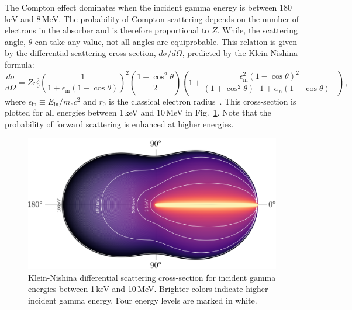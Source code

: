 The Compton effect dominates when the incident gamma energy is between 180\,keV and 8\,MeV. The probability of Compton scattering depends on the number of electrons in the absorber and is therefore proportional to $Z$. While, the scattering angle, $\theta$ can take any value, not all angles are equiprobable. This relation is given by the differential scattering cross-section, $d\sigma/d\Omega$, predicted by the Klein-Nishina formula:
\begin{equation}
	\frac{d\sigma}{d\Omega} = Zr_0^2\left(\frac{1}{1+\epsilon_\text{in}(1 - \cos\theta)}\right)^2 \left(\frac{1 + \cos^2\theta}{2}\right) \left(1 + \frac{\epsilon_\text{in}^2(1-\cos\theta)^2}{(1+\cos^2\theta)\left[1+\epsilon_\text{in}(1-\cos\theta)\right]}\right)~,
	\label{eq:klein-nishina}
\end{equation}
where $\epsilon_\text{in} \equiv E_\text{in}/m_ec^2$ and $r_0$ is the classical electron radius~\cite{klein-nishina}. This cross-section is plotted for all energies between 1\,keV and 10\,MeV in Fig.~\ref{fig:klein-nishina}. Note that the probability of forward scattering is enhanced at higher energies. 

\begin{figure}[htb]
	\centering
	\includegraphics[width=5in]{figs/gammas/klein_nishina_width_5in.png}
	\caption{Klein-Nishina differential scattering cross-section for incident gamma energies between 1\,keV and 10\,MeV. Brighter colors indicate higher incident gamma energy. Four energy levels are marked in white.}
	\label{fig:klein-nishina}
\end{figure}

